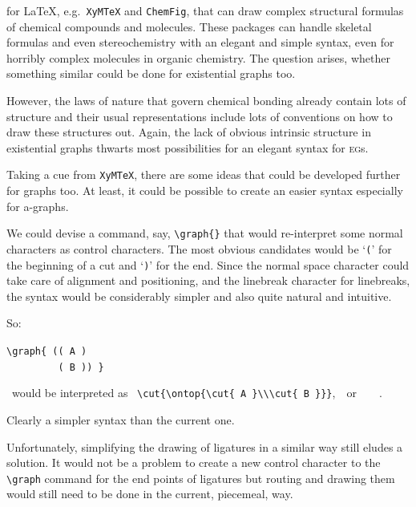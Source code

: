 \documentclass[a4paper,justified]{tufte-handout}
\newcommand{\greek}[1]{{\selectlanguage{polutonikogreek}#1\selectlanguage{english}}}
\newcommand{\sz}[1]{{\scriptsize#1}}
\begin{document}
 for \LaTeX , e.g.\ \texttt{XyMTeX} and \texttt{ChemFig}, that can draw complex structural formulas of chemical compounds and molecules. These packages can handle skeletal formulas and even stereochemistry with an elegant and simple syntax, even for horribly complex molecules in organic chemistry. The question arises, whether something similar could be done for existential graphs too.

However, the laws of nature that govern chemical bonding already contain lots of structure and their usual representations include lots of conventions on how to draw these structures out. Again, the lack of obvious intrinsic structure in existential graphs thwarts most possibilities for an elegant syntax for \textsc{eg}s.

Taking a cue from \texttt{XyMTeX}, there are some ideas that could be developed further for graphs too. At least, it could be possible to create an easier syntax especially for \greek{a}-graphs.

We could devise a command, say, \verb|\graph{}| %
that would re-interpret some normal characters as control characters. The most obvious candidates would be `\texttt{(}' for the beginning of a cut and `\texttt{)}' for the end. Since the normal space character could take care of alignment and positioning, and the linebreak character for linebreaks, the syntax would be considerably simpler and also quite natural and intuitive.

\noindent So: \ \begin{minipage}{.3\textwidth}\verb|\graph{ (( A )|\\\verb|         ( B )) }|\end{minipage} \ would be interpreted as \ \verb||,~\mbox{ or \ \sz{ \cut{\ontop{\cut{ A }\\\cut{ B }}}} .}

\noindent Clearly a simpler syntax than the current one.

Unfortunately, simplifying the drawing of ligatures in a similar way still eludes a solution. It would not be a problem to create a new control character to the \verb|\graph| command for the end points of ligatures but routing and drawing them would still need to be done in the current, piecemeal, way.\newpage

\end{document}
